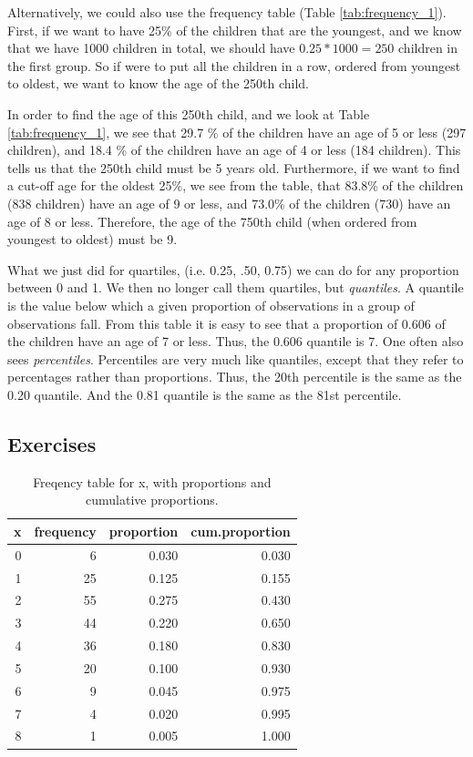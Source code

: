 \documentclass[]{report}\usepackage[]{graphicx}\usepackage[]{color}
\begin{document}
Alternatively, we could also use the frequency table (Table \ref{tab:frequency_1}). First, if we want to have 25\% of the children that are the youngest, and we know that we have 1000 children in total, we should have $0.25 * 1000=250$ children in the first group. So if were to put all the children in a row, ordered from youngest to oldest, we want to know the age of the 250th child.

In order to find the age of this 250th child, and we look at Table \ref{tab:frequency_1}, we see that 29.7 \% of the children have an age of 5 or less (297 children), and 18.4 \% of the children have an age of 4 or less (184 children). This tells us that the 250th child must be 5 years old. Furthermore, if we want to find a cut-off age for the oldest 25\%, we see from the table, that 83.8\% of the children (838 children) have an age of 9 or less, and 73.0\% of the children (730) have an age of 8 or less. Therefore, the age of the 750th child (when ordered from youngest to oldest) must be 9.


What we just did for quartiles, (i.e. 0.25, .50, 0.75) we can do for any proportion between 0 and 1. We then no longer call them quartiles, but \textit{quantiles}. A quantile is the value below which a given proportion of observations in a group of observations fall. From this table it is easy to see that a proportion of 0.606 of the children have an age of 7 or less. Thus, the 0.606 quantile is 7. One often also sees \textit{percentiles}. Percentiles are very much like quantiles, except that they refer to percentages rather than proportions. Thus, the 20th percentile is the same as the 0.20 quantile. And the 0.81 quantile is the same as the 81st percentile.



\subsection{Exercises}

\begin{table}[ht]
\centering
\caption{Freqency table for x, with proportions and cumulative proportions.} 
\label{tab:frequency_2}
\begin{tabular}{rrrr}
  \hline
x & frequency & proportion & cum.proportion \\ 
  \hline
   0 &    6 & 0.030 & 0.030 \\ 
     1 &   25 & 0.125 & 0.155 \\ 
     2 &   55 & 0.275 & 0.430 \\ 
     3 &   44 & 0.220 & 0.650 \\ 
     4 &   36 & 0.180 & 0.830 \\ 
     5 &   20 & 0.100 & 0.930 \\ 
     6 &    9 & 0.045 & 0.975 \\ 
     7 &    4 & 0.020 & 0.995 \\ 
     8 &    1 & 0.005 & 1.000 \\ 
   \hline
\end{tabular}
\end{table}
\end{document}
